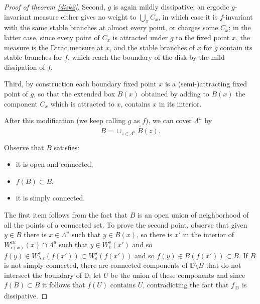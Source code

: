 \documentclass[a4paper,11pt]{article}
\theoremstyle{definition}
\def\DD{{\mathbb D}}
\def\La{\Lambda}
\def\la{\lambda}
\def\e{\epsilon}
\def\La{\Lambda}
\begin{document}
\begin{proof}[Proof of theorem \ref{disk2}]
Second, $g$ is again mildly dissipative: an ergodic $g$-invariant measure
either gives no weight to $\bigcup_x C_x$, in which case it is
$f$-invariant with the same stable branches at almost every point, or
charges some $C_x$; in the latter case, since every point of $C_x$ is
attracted under $g$ to the fixed point $x$, the measure is the Dirac measure
at $x$, and the stable branches of $x$ for $g$ contain its stable branches
for $f$, which reach the boundary of the disk by the mild dissipation of
$f$.

Third, by construction each boundary fixed point $x$ is a (semi-)attracting
fixed point of $g$, so that the extended box $B(x)$ obtained by adding
to $B(x)$ the component $C_x$  which is attracted to $x$, contains $x$ in
its interior.



After this modification (we keep calling $g$ as $f$), we can cover $\La^u$ by $$B=\cup_{z\in \La^u} \overset{\circ}{B}(z).$$

Observe that $B$ satisfies: 



\begin{itemize}
     \item[--] it is open and connected, 
\item[--] $\overline{f(B)}\subset B,$
 \item[--] it is simply connected.
\end{itemize}



 
 
The  first item follows from the fact that $B$  is an open union of neighborhood  of all the points of a connected set. To prove the second point, observe that 
 given $y\in B$ there is $x\in \La^u$ such that $y\in B(x)$, so  there is $x'$ in the interior of $ W^{cu}_{\e(x)}(x)\cap \La^u$ such that $y\in W^s_{\e}(x')$ and so $f(y)\in W^s_{\la.\e}(f(x'))\subset W^s_\e(f(x'))$ and so $f(y)\in B(f(x'))\subset B.$ If $B$ is not simply connected, there are connected components of $\DD\setminus B$ that do not intersect the boundary of $\DD$; let $U$ be the union of these components and since $\overline{f(B)}\subset B$ it follows that $f(U)$ contains $U$, contradicting  the fact that $f_{|\DD}$ is dissipative.
 

\end{proof}
\end{document}
